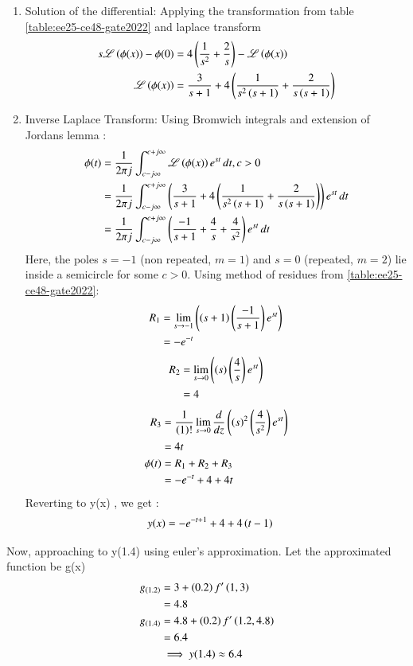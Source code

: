 \documentclass[journal,12pt,onecolumn]{IEEEtran}
\theoremstyle{remark}
\begin{document}
\begin{enumerate}
    \item Solution of the differential:
 Applying the transformation from table \ref{table:ee25-ce48-gate2022} and laplace transform 
    \begin{align}
             s\mathscr{L}\left(\phi(x)\right) - \phi(0) &= 4\left(\frac{1}{s^2}+\frac{2}{s}\right)-\mathscr{L}\left(\phi(x)\right)\\
             \mathscr{L}\left(\phi(x)\right) &= \frac{3}{s+1} + 4\left(\frac{1}{s^2\left(s+1\right)}+\frac{2}{s\left(s+1\right)}\right)
    \end{align}
\item  Inverse Laplace Transform:
Using Bromwich integrals and extension of Jordans lemma :
\begin{align}
    \phi(t) &= \frac{1}{2\pi j}\int_{c-j\infty}^{c+j\infty}\mathscr{L}\left(\phi(x)\right)e^{st}\,dt , c > 0\\
     &= \frac{1}{2\pi j}\int_{c-j\infty}^{c+j\infty}\left(\frac{3}{s+1} + 4\left(\frac{1}{s^2\left(s+1\right)}+\frac{2}{s\left(s+1\right)}\right)\right)e^{st}\,dt\\
     &= \frac{1}{2\pi j}\int_{c-j\infty}^{c+j\infty}\left(\frac{-1}{s+1} + \frac{4}{s} + \frac{4}{s^2}\right)e^{st}\,dt
\end{align}
Here, the poles $s=-1$ (non repeated, $m=1$) and $s=0$ (repeated, $m=2$) lie inside a semicircle for some $c>0$. Using method of residues from \ref{table:ee25-ce48-gate2022}:
\begin{align}
    R_1 &= \lim\limits_{s\to -1}\left({\left(s+1\right)}\left(\frac{-1}{s+1}\right)e^{st}\right) \\
    &= -e^{-t}
\end{align}
\begin{align}
   R_2 &= \lim\limits_{s\to 0}\left({\left(s\right)}\left(\frac{4}{s}\right)e^{st}\right)\\
   &= 4
\end{align}
\begin{align}
 R_3&=\frac{1}{\left(1\right)!}\lim\limits_{s\to 0}\frac{d}{dz}\left({(s)}^{2}\left(\frac{4}{s^2}\right)e^{st}\right)\\
 &=4t\\
\phi(t) &= R_1 + R_2 + R_3\\
&= -e^{-t} + 4 + 4t
\end{align}
Reverting to y(x) , we get :
\begin{align}
    y(x) &= -e^{-t+1} + 4 + 4\left(t-1\right)
\end{align}
\end{enumerate}
Now, approaching to y(1.4) using euler's approximation. Let the approximated function be g(x)
\begin{align}
    g_{\left(1.2\right)} &= 3 + \left(0.2\right)f'\left(1,3\right)\\
    &=4.8\\
    g_{\left(1.4\right)} &= 4.8 +\left(0.2\right)f'\left(1.2,4.8\right)\\
    &= 6.4\\
    &\implies y(1.4) \approx 6.4 
\end{align}
\end{document}
